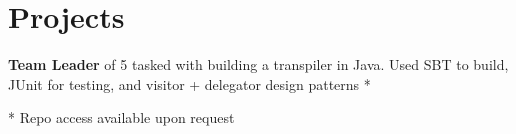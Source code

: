 \documentclass[]{two-column-resume}
\begin{document}
\begin{minipage}[t]{0.65\textwidth}

\section{Projects}
\textbf{Team Leader} of 5 tasked with building a transpiler in Java. Used SBT to build, JUnit for testing, and visitor + delegator design patterns *
\sectionsep



* Repo access available upon request
\end{minipage}

\end{document}
